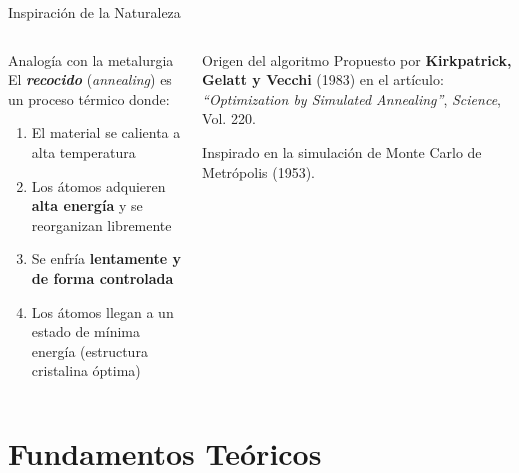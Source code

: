 \documentclass[aspectratio=169,xcolor=dvipsnames]{beamer}
\begin{document}
\begin{frame}{Inspiración de la Naturaleza}
    \begin{columns}
        \begin{block}{Analogía con la metalurgia}
            El \textbf{\textit{recocido}} (\textit{annealing}) es un proceso térmico donde:
            \begin{enumerate}
                \item El material se calienta a alta temperatura
                \item Los átomos adquieren \textbf{alta energía} y se reorganizan libremente
                \item Se enfría \textbf{lentamente y de forma controlada}
                \item Los átomos llegan a un estado de mínima energía (estructura cristalina óptima)
            \end{enumerate}
        \end{block}
        \begin{exampleblock}{Origen del algoritmo}
            Propuesto por \textbf{Kirkpatrick, Gelatt y Vecchi} (1983) en el artículo:
            \textit{``Optimization by Simulated Annealing''}, \textit{Science}, Vol. 220.
            \vspace{0.2cm}
            
            Inspirado en la simulación de Monte Carlo de Metrópolis (1953).
        \end{exampleblock}
    \end{columns}
\end{frame}

\section{Fundamentos Teóricos}
\end{document}

